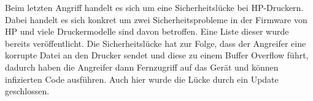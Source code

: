 Beim letzten Angriff handelt es sich um eine Sicherheitslücke bei HP-Druckern. Dabei handelt es sich konkret um zwei
Sicherheitsprobleme in der Firmware von HP und viele Druckermodelle sind davon betroffen. Eine Liste dieser wurde
bereits veröffentlicht. Die Sicherheitslücke hat zur Folge, dass der Angreifer eine korrupte Datei an den Drucker
sendet und diese zu einem Buffer Overflow führt, dadurch haben die Angreifer dann Fernzugriff auf das Gerät und können
infizierten Code ausführen. Auch hier wurde die Lücke durch ein Update geschlossen.



